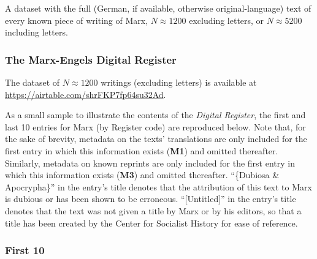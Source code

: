A dataset with the full (German, if available, otherwise original-language) text of every known piece of writing of Marx, $N \approx 1200$ excluding letters, or $N \approx 5200$ including letters.

\subsubsection{The Marx-Engels Digital Register}

The dataset of $N \approx 1200$ writings (excluding letters) is available at \href{https://airtable.com/shrFKP7fp64su32Ad}{https://airtable.com/shrFKP7fp64su32Ad}.

As a small sample to illustrate the contents of the \textit{Digital Register}, the first and last 10 entries for Marx (by Register code) are reproduced below. Note that, for the sake of brevity, metadata on the texts' translations are only included for the first entry in which this information exists (\textbf{M1}) and omitted thereafter. Similarly, metadata on known reprints are only included for the first entry in which this information exists (\textbf{M3}) and omitted thereafter. ``\{Dubiosa \& Apocrypha\}'' in the entry's title denotes that the attribution of this text to Marx is dubious or has been shown to be erroneous. ``[Untitled]'' in the entry's title denotes that the text was not given a title by Marx or by his editors, so that a title has been created by the Center for Socialist History for ease of reference.

\subsubsection*{First 10}

